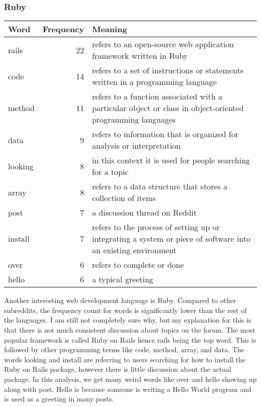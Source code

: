 \documentclass{article}
\theoremstyle{theorem}
\theoremstyle{definition}
\theoremstyle{remark}
\begin{document}
\subsubsection{Ruby}
\begin{tabular}{ | l | r | p{7cm} | }
\hline
Word & Frequency & Meaning \\
\hline
rails & 22 & refers to an open-source web application framework written in Ruby \\
\hline
code & 14 & refers to a set of instructions or statements written in a programming language \\
\hline
method & 11 & refers to a function associated with a particular object or class in object-oriented programming languages \\
\hline
data & 9 & refers to information that is organized for analysis or interpretation \\
\hline
looking & 8 & in this context it is used for people searching for a topic \\
\hline
array & 8 & refers to a data structure that stores a collection of items \\
\hline
post & 7 & a discussion thread on Reddit \\
\hline
install & 7 & refers to the process of setting up or integrating a system or piece of software into an existing environment \\
\hline
over & 6 & refers to complete or done \\
\hline
hello & 6 & a typical greeting \\
\hline
\end{tabular}

\medskip
Another interesting web development language is Ruby. Compared to other subreddits, the frequency count for words is significantly lower than the rest of the languages. I am still not completely sure why, but my explanation for this is that there is not much consistent discussion about topics on the forum. The most popular framework is called Ruby on Rails hence rails being the top word. This is followed by other programming terms like code, method, array, and data. The words looking and install are referring to users searching for how to install the Ruby on Rails package, however there is little discussion about the actual package. In this analysis, we get many weird words like over and hello showing up along with post. Hello is because someone is writing a Hello World program and is used as a greeting in many posts. 
\end{document}
